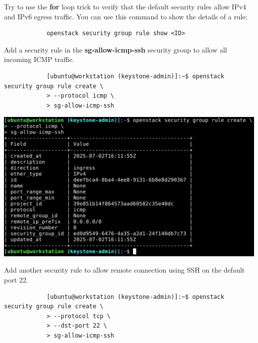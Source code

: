 \documentclass[letterpaper, 12pt]{article}
\begin{document}
\begin{enumerate}
    \begin{tipbox}
        Try to use the \textbf{for} loop trick to verify that the default security rules allow IPv4 and IPv6 egress traffic.
        You can use this command to show the details of a rule:
        \begin{lstlisting}
            openstack security group rule show <ID>
        \end{lstlisting}
    \end{tipbox}

    \begin{labstep}
        Add a security rule in the \textbf{sg-allow-icmp-ssh} security group to allow all incoming ICMP traffic.
        \begin{lstlisting}
            [ubuntu@workstation (keystone-admin)]:~$ openstack security group rule create \
            > --protocol icmp \
            > sg-allow-icmp-ssh
        \end{lstlisting}

        \begin{center}
            \includegraphics[scale=0.45]{images/part5/step26.png}
        \end{center}
    \end{labstep}

    \begin{labstep}
        Add another security rule to allow remote connection using SSH on the default port 22.
        \begin{lstlisting}
            [ubuntu@workstation (keystone-admin)]:~$ openstack security group rule create \
            > --protocol tcp \
            > --dst-port 22 \
            > sg-allow-icmp-ssh
        \end{lstlisting}


\end{labstep}
\end{enumerate}
\end{document}
